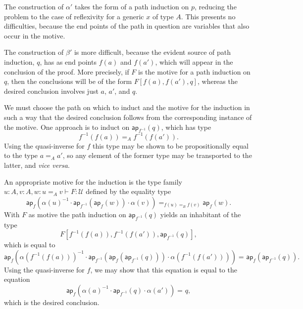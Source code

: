 \documentclass{article}
\newcommand{\idty}[3]{{#2}\mathbin{=_{#1}}{#3}}
\newcommand{\app}[2]{{#1}({#2})}
\newcommand{\pa}[1]{\mathsf{ap}_{#1}}
\newcommand{\univty}{\mathcal{U}}
\newcommand{\iv}[1]{#1^{-1}}
\newcommand{\concat}[2]{{#1}\cdot{#2}}
\begin{document}
The construction of $\alpha'$ takes the form of a path induction on $p$,
reducing the problem to the case of reflexivity for a generic $x$ of type $A$.
This presents no difficulties, because the end points of the path in question
are variables that also occur in the motive.

The construction of $\beta'$ is more difficult, because the evident source of
path induction, $q$, has as end points $\app{f}{a}$ and $\app{f}{a'}$, which
will appear in the conclusion of the proof.  More precisely, if $F$ is the
motive for a path induction on $q$, then the conclusions will be of the form
$F[\app{f}{a},\app{f}{a'},q]$, whereas the desired conclusion involves just $a$,
$a'$, and $q$.

We must choose the path on which to induct and the motive for the induction in
such a way that the desired conclusion follows from the corresponding instance
of the motive.  One approach is to induct on $\app{\pa{\iv{f}}}{q}$, which
has type
$$\idty{A}{\app{\iv{f}}{\app{f}{a}}}{\app{\iv{f}}{\app{f}{a'}}}.$$
Using the quasi-inverse for $f$ this type may be shown to be propositionally
equal to the type $\idty{A}{a}{a'}$, so any element of the former type may be
transported to the latter, and \textit{vice versa}.

An appropriate motive for the induction is the type family
$u{:}A,v{:}A,w{:}\idty{A}{u}{v}\vdash F:\univty$ defined by the equality type
\begin{displaymath}
  \idty{\idty{B}{\app{f}{u}}{\app{f}{v}}}{\app{\pa{f}}{\concat{\concat{\iv{\app{\alpha}{u}}}{\app{\pa{\iv{f}}}{\app{\pa{f}}{w}}}}{\app{\alpha}{v}}}}{\app{\pa{f}}{w}}.
\end{displaymath}
With $F$ as motive the path induction on $\app{\pa{\iv{f}}}{q}$ yields an inhabitant
of the type
$${F[\app{\iv{f}}{\app{f}{a}},\app{\iv{f}}{\app{f}{a'}},\app{\pa{\iv{f}}}{q}]},$$
which is equal to
\begin{displaymath}
  \idty{}
  {\app{\pa{f}}
    {\concat
      {\concat
        {\iv{\app{\alpha}{\app{\iv{f}}{\app{f}{a}}}}}
        {\app{\pa{\iv{f}}}{\app{\pa{f}}{\app{\pa{\iv{f}}}{q}}}}
      }
      {\app{\alpha}{\app{\iv{f}}{\app{f}{a'}}}}
    }
  }
  {\app{\pa{f}}{\app{\pa{\iv{f}}}{q}}}.
\end{displaymath}
Using the quasi-inverse for $f$, we may show that this equation is equal to the equation
\begin{displaymath}
  \idty{}
  {\app{\pa{f}}
      {\concat
        {\concat
          {\iv{\app{\alpha}{{a}}}}
          {\app{\pa{\iv{f}}}{q}}
        }
        {\app{\alpha}{a'}}
      }
    }
    {q},
\end{displaymath}
which is the desired conclusion.
\end{document}
